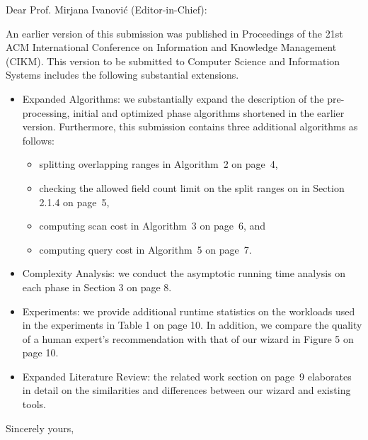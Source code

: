 \documentclass{letter} %
\begin{document}
\begin{letter}
\opening{Dear Prof. Mirjana Ivanovi\'c (Editor-in-Chief):} 
 
\noindent An earlier version of this submission was published in Proceedings of the 21st ACM \hbox{International} Conference on Information and Knowledge Management (CIKM). 
This version to be submitted to Computer Science and Information Systems includes the following substantial extensions.

\begin{itemize}

\item Expanded Algorithms: we substantially expand the description of the pre-processing, initial and optimized phase algorithms shortened in the earlier version. Furthermore, this submission contains three additional algorithms as follows:

\begin{itemize}

\item splitting overlapping ranges in Algorithm~2 on page~4,
\item checking the allowed field count limit on the split ranges on in Section 2.1.4 on page~5,
\item computing scan cost in Algorithm~3 on page~6, and
\item computing query cost in Algorithm~5 on page~7.

\end{itemize} 
 
\item Complexity Analysis: we conduct the asymptotic running time analysis on each phase in Section 3 on page 8.

\item Experiments: we provide additional runtime statistics on the workloads used in the experiments in Table 1 on page 10. 
In addition, we compare the quality of a human expert's recommendation with that of our wizard in Figure 5 on page 10.

\item Expanded Literature Review: the related work section on page~9 elaborates in detail on the similarities and differences between our wizard and existing tools.

\end{itemize} 
 
\closing{Sincerely yours,} 

\end{letter}
 
\end{document}
